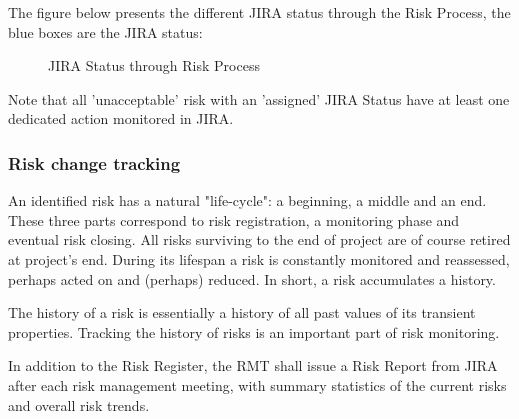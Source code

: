 The figure below presents the different JIRA status through the Risk Process, the blue boxes are the JIRA status:

\begin{figure}[H]
\begin{center}
\end{center}
\caption{JIRA Status through Risk Process}
\label{fig:riskJIRA}
\end{figure}


Note that all 'unacceptable' risk with an 'assigned' JIRA Status have at least one dedicated action monitored in JIRA.

\subsubsection{Risk change tracking}

An identified risk has a natural "life-cycle": a beginning, a middle and an end. These three parts correspond to risk registration, a monitoring phase and eventual risk closing. All risks surviving to the end of project are of course retired at project's end. During its lifespan a risk is constantly monitored and reassessed, perhaps acted on and (perhaps) reduced. In short, a risk accumulates a history.

The history of a risk is essentially a history of all past values of its transient properties. Tracking the history of risks is an important part of risk monitoring.

In addition to the Risk Register, the RMT shall issue a Risk Report from JIRA after each risk management meeting, with summary statistics of the current risks and overall risk trends.

